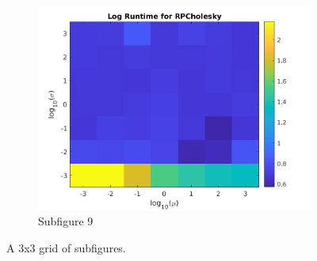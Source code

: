 \documentclass[12pt,letterpaper]{article}
\begin{document}
\begin{enumerate}
\begin{figure}[ht]
\begin{subfigure}[t]{0.3\textwidth}
        \includegraphics[width=\textwidth]{plots/rpc3.png}
        \caption{Subfigure 9}
        \label{fig:sub9}
    \end{subfigure}

    \caption{A 3x3 grid of subfigures.}
    \label{fig:grid}
\end{figure}

\end{enumerate}
\end{document}
